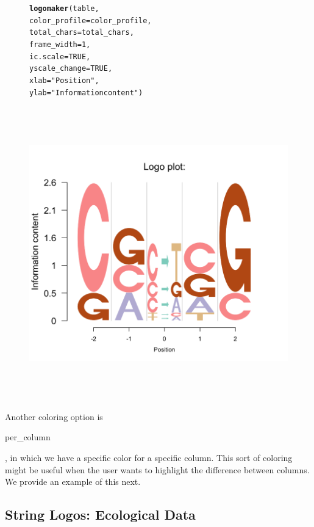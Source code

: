 \documentclass[12pt]{article}\usepackage[]{graphicx}\usepackage[usenames,dvipsnames]{color}
\makeatletter
\newcommand{\hlnum}[1]{\textcolor[rgb]{0.686,0.059,0.569}{#1}}%
\newcommand{\hlstr}[1]{\textcolor[rgb]{0.192,0.494,0.8}{#1}}%
\newcommand{\hlstd}[1]{\textcolor[rgb]{0.345,0.345,0.345}{#1}}%
\newcommand{\hlkwc}[1]{\textcolor[rgb]{0.333,0.667,0.333}{#1}}%
\newcommand{\hlkwd}[1]{\textcolor[rgb]{0.737,0.353,0.396}{\textbf{#1}}}%
\newenvironment{kframe}{%
 \def\at@end@of@kframe{}%
 \ifinner\ifhmode%
  \def\at@end@of@kframe{\end{minipage}}%
  \begin{minipage}{\columnwidth}%
 \fi\fi%
 \def\FrameCommand##1{\hskip\@totalleftmargin \hskip-\fboxsep
 \colorbox{shadecolor}{##1}\hskip-\fboxsep
     \hskip-\linewidth \hskip-\@totalleftmargin \hskip\columnwidth}%
 \MakeFramed {\advance\hsize-\width
   \@totalleftmargin\z@ \linewidth\hsize
   \@setminipage}}%
 {\par\unskip\endMakeFramed%
 \at@end@of@kframe}
\newenvironment{knitrout}{}{} %
\makeatother
\begin{document}
\begin{figure}[htp]
\begin{center}
\begin{knitrout}
\begin{kframe}
\begin{alltt}
\hlkwd{logomaker}\hlstd{(table,}
          \hlkwc{color_profile} \hlstd{= color_profile,}
          \hlkwc{total_chars} \hlstd{= total_chars,}
          \hlkwc{frame_width} \hlstd{=} \hlnum{1}\hlstd{,}
          \hlkwc{ic.scale} \hlstd{=} \hlnum{TRUE}\hlstd{,}
          \hlkwc{yscale_change}\hlstd{=}\hlnum{TRUE}\hlstd{,}
          \hlkwc{xlab} \hlstd{=} \hlstr{"Position"}\hlstd{,}
          \hlkwc{ylab} \hlstd{=} \hlstr{"Information content"}\hlstd{)}
\end{alltt}
\end{kframe}
\includegraphics[width=6in,height=5in]{figure/logolas_use_7-1} 

\end{knitrout}
\end{center}
\end{figure}

Another coloring option is \begin{verb} per_column \end{verb}, in which we have a specific color for a specific column. This sort of coloring might be useful when the user wants to
highlight the difference between columns. We provide an example of this next.

\clearpage

\subsection{String Logos:  Ecological Data}
\end{document}
